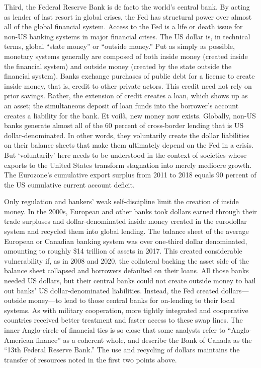 \documentclass[
]{book}
\begin{document}
Third, the Federal Reserve Bank is de facto the world's central bank. By acting as lender of last resort in global crises, the Fed has structural power over almost all of the global financial system. Access to the Fed is a life or death issue for non-US banking systems in major financial crises. The US dollar is, in technical terms, global ``state money'' or ``outside money.'' Put as simply as possible, monetary systems generally are composed of both inside money (created inside the financial system) and outside money (created by the state outside the financial system). Banks exchange purchases of public debt for a license to create inside money, that is, credit to other private actors. This credit need not rely on prior savings. Rather, the extension of credit creates a loan, which shows up as an asset; the simultaneous deposit of loan funds into the borrower's account creates a liability for the bank. Et voilà, new money now exists. Globally, non-US banks generate almost all of the 60 percent of cross-border lending that is US dollar-denominated. In other words, they voluntarily create the dollar liabilities on their balance sheets that make them ultimately depend on the Fed in a crisis. But `voluntarily' here needs to be understood in the context of societies whose exports to the United States transform stagnation into merely mediocre growth. The Eurozone's cumulative export surplus from 2011 to 2018 equals 90 percent of the US cumulative current account deficit.

Only regulation and bankers' weak self-discipline limit the creation of inside money. In the 2000s, European and other banks took dollars earned through their trade surpluses and dollar-denominated inside money created in the eurodollar system and recycled them into global lending. The balance sheet of the average European or Canadian banking system was over one-third dollar denominated, amounting to roughly \$14 trillion of assets in 2017. This created considerable vulnerability if, as in 2008 and 2020, the collateral backing the asset side of the balance sheet collapsed and borrowers defaulted on their loans. All those banks needed US dollars, but their central banks could not create outside money to bail out banks' US dollar-denominated liabilities. Instead, the Fed created dollars---outside money---to lend to those central banks for on-lending to their local systems. As with military cooperation, more tightly integrated and cooperative countries received better treatment and faster access to these swap lines. The inner Anglo-circle of financial ties is so close that some analysts refer to ``Anglo-American finance'' as a coherent whole, and describe the Bank of Canada as the ``13th Federal Reserve Bank.'' The use and recycling of dollars maintains the transfer of resources noted in the first two points above.
\end{document}

